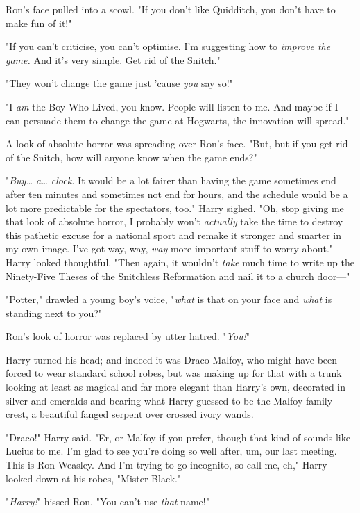 Ron's face pulled into a scowl. "If you don't like Quidditch, you don't have to 
make fun of it!"

"If you can't criticise, you can't optimise. I'm suggesting how to 
\emph{improve the game.} And it's very simple. Get rid of the Snitch."

"They won't change the game just 'cause \emph{you} say so!"

"I \emph{am} the Boy-Who-Lived, you know. People will listen to me. And maybe 
if I can persuade them to change the game at Hogwarts, the innovation will 
spread."

A look of absolute horror was spreading over Ron's face. "But, but if you get 
rid of the Snitch, how will anyone know when the game ends?"

"\emph{Buy{\ldots} a{\ldots} clock.} It would be a lot fairer than having the 
game sometimes end after ten minutes and sometimes not end for hours, and the 
schedule would be a lot more predictable for the spectators, too." Harry 
sighed. "Oh, stop giving me that look of absolute horror, I probably won't 
\emph{actually} take the time to destroy this pathetic excuse for a national 
sport and remake it stronger and smarter in my own image. I've got way, way, 
\emph{way} more important stuff to worry about." Harry looked thoughtful. "Then 
again, it wouldn't \emph{take} much time to write up the Ninety-Five Theses of 
the Snitchless Reformation and nail it to a church door---"

"Potter," drawled a young boy's voice, "\emph{what} is that on your face and 
\emph{what} is standing next to you?"

Ron's look of horror was replaced by utter hatred. "\emph{You!}"

Harry turned his head; and indeed it was Draco Malfoy, who might have been 
forced to wear standard school robes, but was making up for that with a trunk 
looking at least as magical and far more elegant than Harry's own, decorated in 
silver and emeralds and bearing what Harry guessed to be the Malfoy family 
crest, a beautiful fanged serpent over crossed ivory wands.

"Draco!" Harry said. "Er, or Malfoy if you prefer, though that kind of sounds 
like Lucius to me. I'm glad to see you're doing so well after, um, our last 
meeting. This is Ron Weasley. And I'm trying to go incognito, so call me, eh," 
Harry looked down at his robes, "Mister Black."

"\emph{Harry!}" hissed Ron. "You can't use \emph{that} name!"

